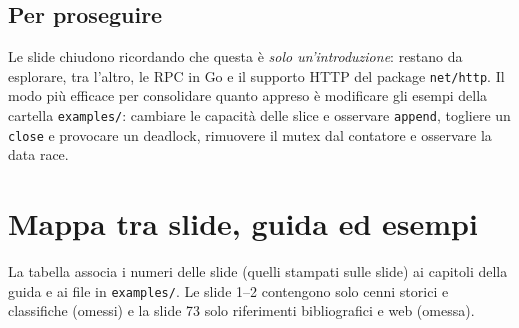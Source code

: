 \documentclass[11pt,a4paper]{report}
\newcommand{\cod}[1]{\texttt{#1}}
\begin{document}
\section*{Per proseguire}

Le slide chiudono ricordando che questa è \emph{solo un'introduzione}: restano da
esplorare, tra l'altro, le RPC in Go e il supporto HTTP del package
\cod{net/http}. Il modo più efficace per consolidare quanto appreso è
modificare gli esempi della cartella \texttt{examples/}: cambiare le capacità
delle slice e osservare \cod{append}, togliere un \cod{close} e provocare un
deadlock, rimuovere il mutex dal contatore e osservare la data race.

\appendix
\chapter{Mappa tra slide, guida ed esempi}

La tabella associa i numeri delle slide (quelli stampati sulle slide)
ai capitoli della guida e ai file in \texttt{examples/}. Le slide 1--2 contengono
solo cenni storici e classifiche (omessi) e la slide 73 solo riferimenti
bibliografici e web (omessa).
\end{document}
